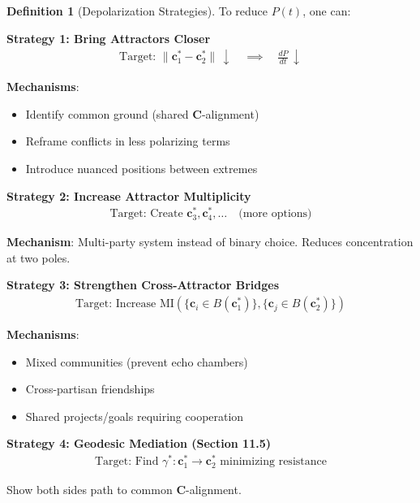 \documentclass[11pt,a4paper]{article}
\theoremstyle{definition}
\newtheorem{definition}{Definition}[section]
\theoremstyle{remark}
\newcommand{\cc}{\mathbf{c}}
\begin{document}
\begin{small}
\begin{enumerate}
\begin{definition}[Depolarization Strategies]
To reduce \(P(t)\), one can:

\textbf{Strategy 1: Bring Attractors Closer}
\begin{align}
\text{Target: } \|\cc^*_1 - \cc^*_2\| \, \downarrow \quad \implies \quad \frac{dP}{dt} \, \downarrow
\end{align}

\textbf{Mechanisms}:
\begin{itemize}
    \item Identify common ground (shared \(\mathbf{C}\)-alignment)
    \item Reframe conflicts in less polarizing terms
    \item Introduce nuanced positions between extremes
\end{itemize}

\textbf{Strategy 2: Increase Attractor Multiplicity}
\begin{align}
\text{Target: Create } \cc^*_3, \cc^*_4, \ldots \quad \text{(more options)}
\end{align}

\textbf{Mechanism}: Multi-party system instead of binary choice. Reduces concentration at two poles.

\textbf{Strategy 3: Strengthen Cross-Attractor Bridges}
\begin{align}
\text{Target: Increase } \text{MI}(\{\cc_i \in B(\cc^*_1)\}, \{\cc_j \in B(\cc^*_2)\})
\end{align}

\textbf{Mechanisms}:
\begin{itemize}
    \item Mixed communities (prevent echo chambers)
    \item Cross-partisan friendships
    \item Shared projects/goals requiring cooperation
\end{itemize}

\textbf{Strategy 4: Geodesic Mediation (Section 11.5)}
\begin{align}
\text{Target: Find } \gamma^*: \cc^*_1 \to \cc^*_2 \text{ minimizing resistance}
\end{align}

Show both sides path to common \(\mathbf{C}\)-alignment.
\end{definition}

\begin{figure}[H]
\centering
{}
\end{figure}
\end{enumerate}
\end{small}
\end{document}
